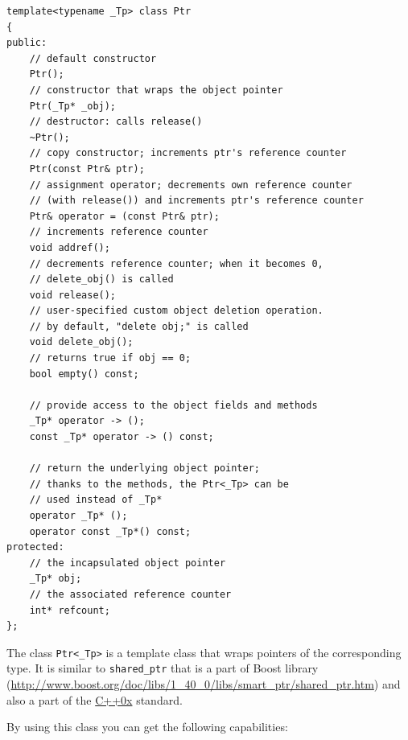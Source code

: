 \begin{lstlisting}
template<typename _Tp> class Ptr
{
public:
    // default constructor
    Ptr();
    // constructor that wraps the object pointer
    Ptr(_Tp* _obj);
    // destructor: calls release()
    ~Ptr();
    // copy constructor; increments ptr's reference counter
    Ptr(const Ptr& ptr);
    // assignment operator; decrements own reference counter
    // (with release()) and increments ptr's reference counter 
    Ptr& operator = (const Ptr& ptr);
    // increments reference counter
    void addref();
    // decrements reference counter; when it becomes 0,
    // delete_obj() is called
    void release();
    // user-specified custom object deletion operation.
    // by default, "delete obj;" is called
    void delete_obj();
    // returns true if obj == 0;
    bool empty() const;

    // provide access to the object fields and methods
    _Tp* operator -> ();
    const _Tp* operator -> () const;

    // return the underlying object pointer;
    // thanks to the methods, the Ptr<_Tp> can be
    // used instead of _Tp*
    operator _Tp* ();
    operator const _Tp*() const;
protected:
    // the incapsulated object pointer
    _Tp* obj;
    // the associated reference counter
    int* refcount;
};
\end{lstlisting}

The class \texttt{Ptr<\_Tp>} is a template class that wraps pointers of the corresponding type. It is similar to \texttt{shared\_ptr} that is a part of Boost library (\url{http://www.boost.org/doc/libs/1_40_0/libs/smart_ptr/shared_ptr.htm}) and also a part of the
\href{http://en.wikipedia.org/wiki/C%2B%2B0x}{C++0x} standard. 

By using this class you can get the following capabilities:


